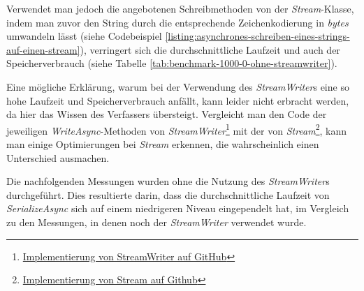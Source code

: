 \begin{table}[h]
    \caption{Benchmark mit 1000 Options und mit einer Payload von 0 Bytes, jedoch ohne StreamWriter.}
    \label{tab:benchmark-1000-0-ohne-streamwriter}
\end{table}

Verwendet man jedoch die angebotenen Schreibmethoden von der \textit{Stream}-Klasse, indem man zuvor den String durch die entsprechende Zeichenkodierung in \textit{bytes} umwandeln lässt (siehe Codebeispiel \ref{listing:asynchrones-schreiben-eines-strings-auf-einen-stream}), verringert sich die durchschnittliche Laufzeit und auch der Speicherverbrauch (siehe Tabelle \ref{tab:benchmark-1000-0-ohne-streamwriter}).

Eine mögliche Erklärung, warum bei der Verwendung des \textit{StreamWriter}s eine so hohe Laufzeit und Speicherverbrauch anfällt, kann leider nicht erbracht werden, da hier das Wissen des Verfassers übersteigt. Vergleicht man den Code der jeweiligen \textit{WriteAsync}-Methoden von \textit{StreamWriter}\footnote{\href{https://github.com/microsoft/referencesource/blob/master/mscorlib/system/io/streamwriter.cs}{Implementierung von StreamWriter auf GitHub}} mit der von \textit{Stream}\footnote{\href{https://github.com/microsoft/referencesource/blob/master/mscorlib/system/io/stream.cs}{Implementierung von Stream auf Github}}, kann man einige Optimierungen bei \textit{Stream} erkennen, die wahrscheinlich einen Unterschied ausmachen.

Die nachfolgenden Messungen wurden ohne die Nutzung des \textit{StreamWriter}s durchgeführt. Dies resultierte darin, dass die durchschnittliche Laufzeit von \textit{SerializeAsync} sich auf einem niedrigeren Niveau eingependelt hat, im Vergleich zu den Messungen, in denen noch der \textit{StreamWriter} verwendet wurde.

